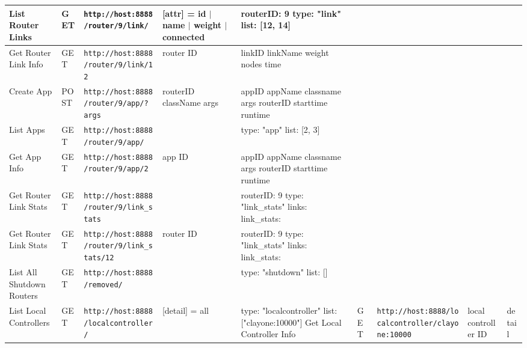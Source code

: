 {\begin{longtable}{ | L{1.4cm} | >{\footnotesize}L{1.4cm} | p{6.5cm} | L{1.8cm} | L{2.1cm} | }
\hline
List Router Links & GET & \texttt{http://host:8888/router/9/link/} & [attr] = id $|$ name $|$ weight $|$ connected
 & routerID: 9
type: "link"
list: [12, 14] \\
\hline
Get Router Link Info & GET & \texttt{http://host:8888/router/9/link/12} & router ID & linkID
linkName
weight
nodes
time \\
\hline
Create App & POST & \texttt{http://host:8888/router/9/app/?args} & routerID
className
args & appID
appName
classname
args
routerID
starttime
runtime \\
\hline
List Apps & GET & \texttt{http://host:8888/router/9/app/} &  & type: "app"
list: [2, 3] \\
\hline
Get App Info & GET & \texttt{http://host:8888/router/9/app/2} & app ID & appID
appName
classname
args
routerID
starttime
runtime \\
\hline
Get Router Link Stats & GET & \texttt{http://host:8888/router/9/link\_stats} &  & routerID: 9
type: "link\_stats"
links:
link\_stats:\\
\hline
Get Router Link Stats & GET & \texttt{http://host:8888/router/9/link\_stats/12} &
\newline
router ID & routerID: 9
type: "link\_stats"
links:
link\_stats:\\
\hline
List All Shutdown Routers & GET & \texttt{http://host:8888/removed/} &  & type: "shutdown"
list: [] \\
\hline
List Local Controllers & GET & \texttt{http://host:8888/localcontroller/} & [detail] = all & type: "localcontroller" list: ["clayone:10000"]
\hline
Get Local Controller Info & GET & \texttt{http://host:8888/localcontroller/clayone:10000} &
\newline
local controller ID & detail
\hline
\end{longtable}

\normalsize

}
